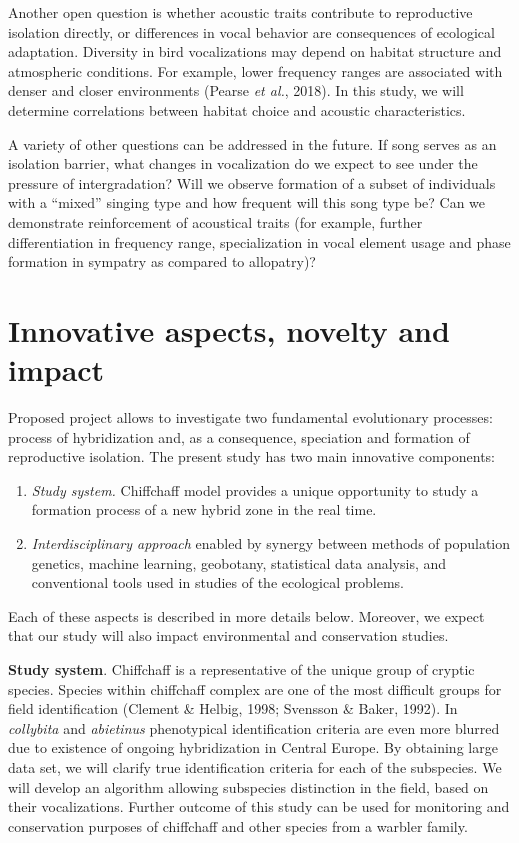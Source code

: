 \documentclass[11pt,a4paper]{article}
\begin{document}
Another open question is whether acoustic traits contribute to reproductive isolation directly, or differences in vocal behavior are consequences of ecological adaptation. Diversity in bird vocalizations may depend on habitat structure and atmospheric conditions. For example, lower frequency ranges are associated with denser and closer environments (Pearse \textit{et al.}, 2018). In this study, we will determine correlations between habitat choice and acoustic characteristics. 

A variety of other questions can be addressed in the future. If song serves as an isolation barrier, what changes in vocalization do we expect to see under the pressure of intergradation? Will we observe formation of a subset of individuals with a ``mixed'' singing type and how frequent will this song type be? Can we demonstrate reinforcement of acoustical traits (for example, further differentiation in frequency range, specialization in vocal element usage and phase formation in sympatry as compared to allopatry)?


\section{Innovative aspects, novelty and impact}
 
Proposed project allows to investigate two fundamental evolutionary processes: process of hybridization and, as a consequence, speciation and formation of reproductive isolation. The present study has two main innovative components:
\begin{enumerate}
\item {\it Study system.} Chiffchaff model provides a unique opportunity to study a formation process of a new hybrid zone in the real time. 
\item {\it Interdisciplinary approach} enabled by synergy between methods of population genetics, machine learning, geobotany, statistical data analysis, and conventional tools used in studies of the ecological problems.
\end{enumerate}

Each of these aspects is described in more details below. Moreover, we expect that our study will also impact environmental and conservation studies.

\textbf{Study system}.  {Chiffchaff is a representative of the unique group of cryptic species.  Species within chiffchaff complex are one of the most difficult groups for field identification (Clement \& Helbig, 1998; Svensson \& Baker, 1992). In \textit{collybita} and \textit{abietinus} phenotypical identification criteria are even more blurred due to existence of ongoing hybridization in Central Europe. By obtaining large data set, we will clarify true identification criteria for each of the subspecies. We will develop an algorithm allowing subspecies distinction in the field, based on their vocalizations. Further outcome of this study can be used for monitoring and conservation purposes of chiffchaff and other species from a warbler family.}
\end{document}
